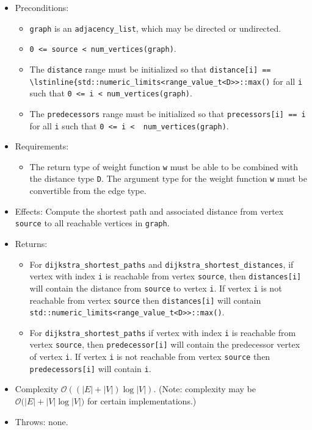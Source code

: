 \begin{itemize}
\item Preconditions:
\begin{itemize}
\item[]
\lstinline{graph} is an \lstinline{adjacency_list}, which may be directed or
undirected.
\item[]
\lstinline{0 <= source < num_vertices(graph)}.
\item[]
  The \lstinline{distance} range must be initialized so that 
    \lstinline{distance[i] == \lstinline{std::numeric_limits<range_value_t<D>>::max()} 
    for all \lstinline{i}
    such that \lstinline{0 <= i < num_vertices(graph)}.  
\item[]
  The \lstinline{predecessors} range must be initialized so that
  \lstinline{precessors[i] == i} for all \lstinline{i} such that 
  \lstinline{0 <= i <  num_vertices(graph)}.
\end{itemize}
\item[] Requirements: 
\begin{itemize}
\item[]
The return type of weight function \lstinline{w} must be able to
  be combined with the distance type \lstinline{D}.  The argument type for the weight
  function \lstinline{w} must be convertible from the edge type.
\end{itemize}
\item[] 
Effects: Compute the shortest path and associated distance from vertex
\lstinline{source} to all reachable vertices in \lstinline{graph}.
\item[] 
Returns:
\begin{itemize}
\item[] For \lstinline{dijkstra_shortest_paths} and \lstinline{dijkstra_shortest_distances},
  if vertex with index \lstinline{i} is reachable from vertex \lstinline{source}, then
  \lstinline{distances[i]} will contain the distance from \lstinline{source} to vertex
  \lstinline{i}.  If vertex \lstinline{i} is not reachable from vertex
  \lstinline{source} then \lstinline{distances[i]} will contain
  \lstinline{std::numeric_limits<range_value_t<D>>::max()}.
\item[]
For \lstinline{dijkstra_shortest_paths} if vertex with index \lstinline{i} is reachable
from vertex \lstinline{source}, then \lstinline{predecessor[i]} will contain the
predecessor vertex of vertex \lstinline{i}.  If vertex \lstinline{i} is not reachable
from vertex \lstinline{source} then \lstinline{predecessors[i]} will contain
\lstinline{i}.
\end{itemize}
%
\item[] Complexity $\mathcal{O}((|E| + |V|)\log{|V|})$.  (Note: complexity may be
$\mathcal{O}(|E| + |V|\log{|V|)}$ for certain implementations.)
\item[] Throws: none. 
\end{itemize}


